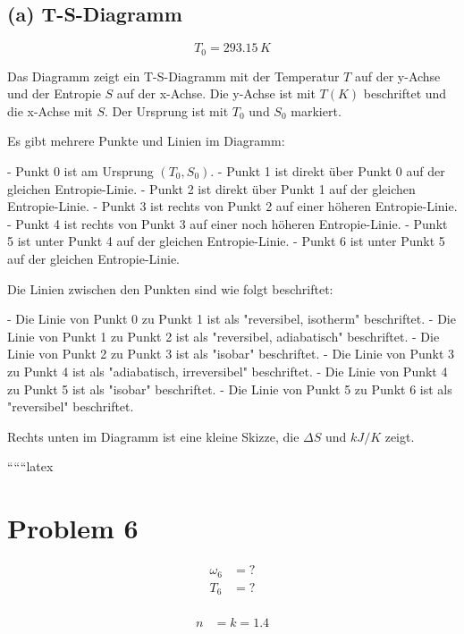 \subsection*{(a) T-S-Diagramm}

\[
T_0 = 293.15 \, K
\]

Das Diagramm zeigt ein T-S-Diagramm mit der Temperatur $T$ auf der y-Achse und der Entropie $S$ auf der x-Achse. Die y-Achse ist mit $T (K)$ beschriftet und die x-Achse mit $S$. Der Ursprung ist mit $T_0$ und $S_0$ markiert. 

Es gibt mehrere Punkte und Linien im Diagramm:

- Punkt 0 ist am Ursprung $(T_0, S_0)$.
- Punkt 1 ist direkt über Punkt 0 auf der gleichen Entropie-Linie.
- Punkt 2 ist direkt über Punkt 1 auf der gleichen Entropie-Linie.
- Punkt 3 ist rechts von Punkt 2 auf einer höheren Entropie-Linie.
- Punkt 4 ist rechts von Punkt 3 auf einer noch höheren Entropie-Linie.
- Punkt 5 ist unter Punkt 4 auf der gleichen Entropie-Linie.
- Punkt 6 ist unter Punkt 5 auf der gleichen Entropie-Linie.

Die Linien zwischen den Punkten sind wie folgt beschriftet:

- Die Linie von Punkt 0 zu Punkt 1 ist als "reversibel, isotherm" beschriftet.
- Die Linie von Punkt 1 zu Punkt 2 ist als "reversibel, adiabatisch" beschriftet.
- Die Linie von Punkt 2 zu Punkt 3 ist als "isobar" beschriftet.
- Die Linie von Punkt 3 zu Punkt 4 ist als "adiabatisch, irreversibel" beschriftet.
- Die Linie von Punkt 4 zu Punkt 5 ist als "isobar" beschriftet.
- Die Linie von Punkt 5 zu Punkt 6 ist als "reversibel" beschriftet.

Rechts unten im Diagramm ist eine kleine Skizze, die $\Delta S$ und $kJ/K$ zeigt.

``````latex


\section*{Problem 6}

\begin{align*}
\omega_6 &= ? \\
T_6 &= ? \\
\end{align*}

\begin{align*}
n &= k = 1.4 \\
\end{align*}


